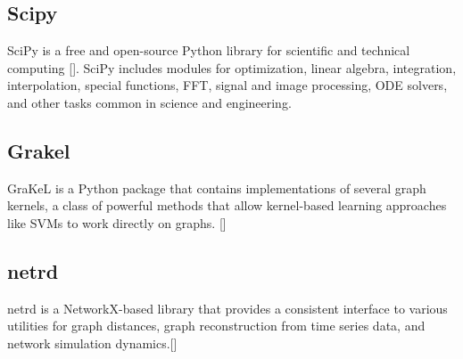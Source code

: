 \subsection{Scipy}
SciPy is a free and open-source Python library for scientific and technical computing [\cite{Virtanen:2020}]. SciPy includes modules for optimization, linear algebra, integration, interpolation, special functions, FFT, signal and image processing, ODE solvers, and other tasks common in science and engineering.

\subsection{Grakel}
GraKeL is a Python package that contains implementations of several graph kernels, a class of powerful methods that allow kernel-based learning approaches like SVMs to work directly on graphs. [\cite{Siglidis:2018}]

\subsection{netrd}
netrd is a NetworkX-based library that provides a consistent interface to various utilities for graph distances, graph reconstruction from time series data, and network simulation dynamics.[\cite{McCabe:2019}]
